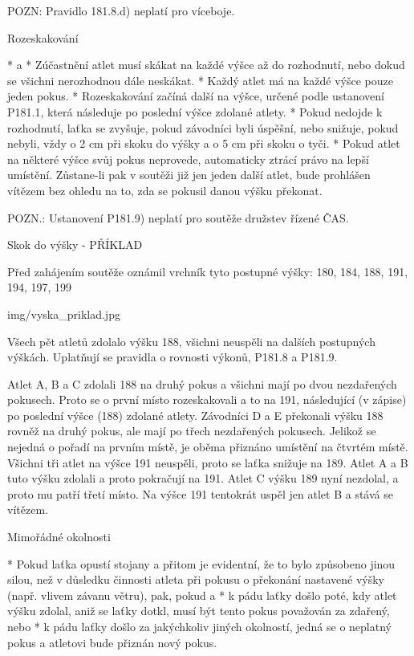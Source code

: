 POZN: Pravidlo 181.8.d) neplatí pro víceboje.

Rozeskakování

* \begitems \style a
  * Zúčastnění atlet musí skákat na každé výšce až do rozhodnutí, nebo dokud se všichni nerozhodnou dále neskákat.
  * Každý atlet má na každé výšce pouze jeden pokus.
  * Rozeskakování začíná další na výšce, určené podle ustanovení P181.1, která následuje po poslední výšce zdolané atlety.
  * Pokud nedojde k rozhodnutí, laťka se zvyšuje, pokud závodníci byli úspěšní, nebo snižuje, pokud nebyli, vždy o 2 cm při skoku do výšky a o 5 cm při skoku o tyči.
  * Pokud atlet na některé výšce svůj pokus neprovede, automaticky ztrácí právo na lepší umístění. Zůstane-li pak v soutěži již jen jeden další atlet, bude prohlášen vítězem bez ohledu na to, zda se pokusil danou výšku překonat.
  \enditems

POZN.: Ustanovení P181.9) neplatí pro soutěže družstev řízené ČAS.

Skok do výšky - PŘÍKLAD

Před zahájením soutěže oznámil vrchník tyto postupné výšky: 180, 184, 188, 191, 194, 197, 199

\picw=8cm \inspic img/vyska_priklad.jpg

Všech pět atletů zdolalo výšku 188, všichni neuspěli na dalších postupných výškách. Uplatňují se pravidla o rovnosti výkonů, P181.8 a P181.9.

Atlet A, B a C zdolali 188 na druhý pokus a všichni mají po dvou nezdařených pokusech. Proto se o první místo rozeskakovali a to na 191, následující (v zápise) po poslední výšce (188) zdolané atlety. Závodníci D a E překonali výšku 188 rovněž na druhý pokus, ale mají po třech nezdařených pokusech. Jelikož se nejedná o pořadí na prvním místě, je oběma přiznáno umístění na čtvrtém místě. Všichni tři atlet na výšce 191 neuspěli, proto se laťka snižuje na 189. Atlet A a B tuto výšku zdolali a proto pokračují na 191. Atlet C výšku 189 nyní nezdolal, a proto mu patří třetí místo.  Na výšce 191 tentokrát uspěl jen atlet B a stává se vítězem.

Mimořádné okolnosti

* Pokud laťka opustí stojany a přitom je evidentní, že to bylo způsobeno jinou silou, než v důsledku činnosti atleta při pokusu o překonání nastavené výšky (např. vlivem závanu větru), pak, pokud
  \begitems \style a
  * k pádu laťky došlo poté, kdy atlet výšku zdolal, aniž se laťky dotkl, musí být tento pokus považován za zdařený, nebo
  * k pádu laťky došlo za jakýchkoliv jiných okolností, jedná se o neplatný pokus a atletovi bude přiznán nový pokus.
  \enditems
\enditems

